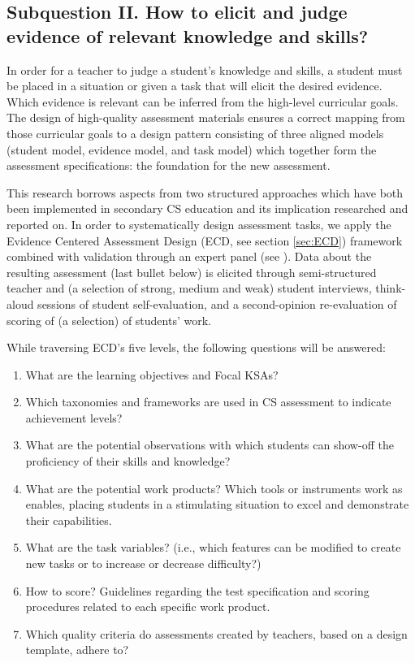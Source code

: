 \subsection{Subquestion II. How to elicit and judge evidence of relevant knowledge and skills?}%

In order for a teacher to judge a student's knowledge and skills, a student must be placed in a situation or given a task that will elicit the desired evidence. Which evidence is relevant can be inferred from the high-level curricular goals. The design of high-quality assessment materials ensures a correct mapping from those curricular goals to a design pattern consisting of three aligned models (student model, evidence model, and task model) which together form the assessment specifications: the foundation for the new assessment.

This research borrows aspects from two structured approaches which have both been implemented in secondary CS education and its implication researched and reported on. In order to systematically design assessment tasks, we apply the Evidence Centered Assessment Design (ECD, see section \ref{sec:ECD}) framework combined with validation through an expert panel (see \cite{catete2017framework}). Data about the resulting assessment (last bullet below) is elicited through semi-structured teacher and (a selection of strong, medium and weak) student interviews, think-aloud sessions of student self-evaluation, and a second-opinion re-evaluation of scoring of (a selection) of students' work.

While traversing ECD's five levels, the following questions will be answered:

\begin{enumerate}
\item What are the learning objectives and Focal KSAs?
\item Which taxonomies and frameworks are used in CS assessment to indicate achievement levels?
\item What are the potential observations with which students can show-off the proficiency of their skills and knowledge?
\item What are the potential work products? Which tools or instruments work as enables, placing students in a stimulating situation to excel and demonstrate their capabilities.
\item What are the task variables? (i.e., which features can be modified to create new tasks or to increase or decrease difficulty?)
\item How to score? Guidelines regarding the test specification and scoring procedures related to each specific work product.
\item Which quality criteria do assessments created by teachers, based on a design template, adhere to?

\end{enumerate}




